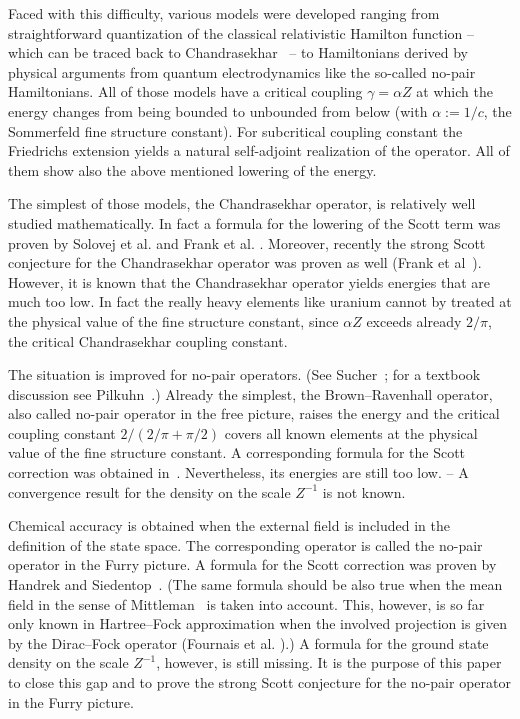 \documentclass[AHL,Unicode,longabstracts,published]{cedram}
\begin{document}
Faced with this difficulty, various models were developed ranging from straightforward quantization of the classical relativistic Hamilton function -- which can be traced back to Chandrasekhar~\cite{Chandrasekhar1931} -- to Hamiltonians derived by physical arguments from quantum electrodynamics like the so-called no-pair Hamiltonians. All of those models have a critical coupling $\gamma=\alpha Z$ at which the energy changes from being bounded to unbounded from below (with $\alpha:=1/c$, the Sommerfeld fine structure constant). For subcritical coupling constant the Friedrichs extension yields a natural self-adjoint realization of the operator. All of them show also the above mentioned lowering of the energy.

The simplest of those models, the Chandrasekhar operator, is relatively well studied mathematically. In fact a formula for the lowering of the Scott term was proven by Solovej et al. \cite{Solovejetal2008} and Frank et al. \cite{Franketal2008}. Moreover, recently the strong Scott conjecture for the Chandrasekhar operator was proven as well (Frank et al~\cite{Franketal2020P}). However, it is known that the Chandrasekhar operator yields energies that are much too low. In fact the really heavy elements like uranium cannot by treated at the physical value of the fine structure constant, since $\alpha Z$ exceeds already $2/\pi$, the critical Chandrasekhar coupling constant.

The situation is improved for no-pair operators. (See Sucher~\cite{Sucher1980,Sucher1984,Sucher1987}; for a textbook discussion see Pilkuhn~\cite{Pilkuhn2005}.) Already the simplest, the Brown--Ravenhall operator, also called no-pair operator in the free picture, raises the energy and the critical coupling constant $2/(2/\pi+\pi/2)$ covers all known elements at the physical value of the fine structure constant. A corresponding formula for the Scott correction was obtained in~\cite{Franketal2009}. Nevertheless, its energies are still too low. \linebreak-- A convergence result for the density on the scale $Z^{-1}$ is not known.

Chemical accuracy is obtained when the external field is included in the definition of the state space. The corresponding operator is called the no-pair operator in the Furry picture. A formula for the Scott correction was proven by Handrek and Siedentop~\cite{HandrekSiedentop2015}. (The same formula should be also true when the mean field in the sense of Mittleman~\cite{Mittleman1981} is taken into account. This, however, is so far only known in Hartree--Fock approximation when the involved projection is given by the Dirac--Fock operator (Fournais et al. \cite{Fournaisetal2020}).) A formula for the ground state density on the scale $Z^{-1}$, however, is still missing. It is the purpose of this paper to close this gap and to prove the strong Scott conjecture for the no-pair operator in the Furry picture.
\end{document}
